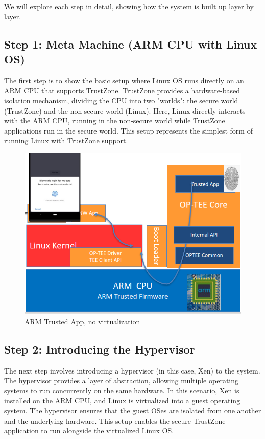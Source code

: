 \documentclass[acmtog]{acmart}
\begin{document}
We will explore each step in detail, showing how the system is built up layer by layer.

\subsection{Step 1: Meta Machine (ARM CPU with Linux OS)}

The first step is to show the basic setup where Linux OS runs directly on an ARM CPU that supports TrustZone. TrustZone provides a hardware-based isolation mechanism, dividing the CPU into two "worlds": the secure world (TrustZone) and the non-secure world (Linux). Here, Linux directly interacts with the ARM CPU, running in the non-secure world while TrustZone applications run in the secure world. This setup represents the simplest form of running Linux with TrustZone support.

\begin{figure}[ht]
  \centering
  \includegraphics[width=\columnwidth]{images/env_1_bare_metal.png}
  \caption{ARM Trusted App, no virtualization}
  \label{fig:image_label}
\end{figure}



\subsection{Step 2: Introducing the Hypervisor}
The next step involves introducing a hypervisor (in this case, Xen) to the system. The hypervisor provides a layer of abstraction, allowing multiple operating systems to run concurrently on the same hardware. In this scenario, Xen is installed on the ARM CPU, and Linux is virtualized into a guest operating system. The hypervisor ensures that the guest OSes are isolated from one another and the underlying hardware. This setup enables the secure TrustZone application to run alongside the virtualized Linux OS.
\end{document}
